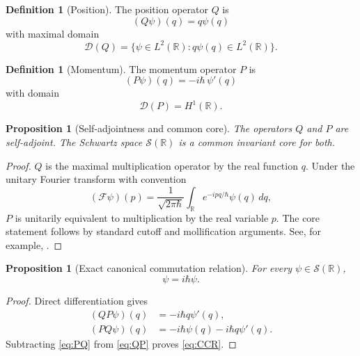 \documentclass[11pt]{amsart}
\numberwithin{equation}{section}
\theoremstyle{plain}
\newtheorem{proposition}[theorem]{Proposition}
\theoremstyle{definition}
\newtheorem{definition}[theorem]{Definition}
\theoremstyle{remark}
\newcommand{\R}{\mathbb{R}}
\newcommand{\Sch}{\mathcal{S}}
\newcommand{\Four}{\mathcal{F}}
\newcommand{\Dom}{\mathcal{D}}
\begin{document}
\begin{definition}[Position]
\label{def:position}
The position operator $Q$ is
\begin{equation}
(Q\psi)(q)=q\psi(q)
\label{eq:Q_action}
\end{equation}
with maximal domain
\begin{equation}
\Dom(Q)=\{\psi\in L^2(\R):q\psi(q)\in L^2(\R)\}.
\label{eq:Q_domain}
\end{equation}
\end{definition}

\begin{definition}[Momentum]
\label{def:momentum}
The momentum operator $P$ is
\begin{equation}
(P\psi)(q)=-i\hbar\,\psi'(q)
\label{eq:P_action}
\end{equation}
with domain
\begin{equation}
\Dom(P)=H^1(\R).
\label{eq:P_domain}
\end{equation}
\end{definition}

\begin{proposition}[Self-adjointness and common core]
\label{prop:self_adjoint_QP}
The operators $Q$ and $P$ are self-adjoint.  The Schwartz space
$\Sch(\R)$ is a common invariant core for both.
\end{proposition}

\begin{proof}
$Q$ is the maximal multiplication operator by the real function $q$.  Under
the unitary Fourier transform with convention
\begin{equation}
(\Four\psi)(p)
=
\frac{1}{\sqrt{2\pi\hbar}}
\int_{\R}e^{-ipq/\hbar}\psi(q)\,dq,
\label{eq:fourier_transform}
\end{equation}
$P$ is unitarily equivalent to multiplication by the real variable $p$.
The core statement follows by standard cutoff and mollification arguments.
See, for example, \cite{ReedSimon1980}.
\end{proof}

\begin{proposition}[Exact canonical commutation relation]
\label{prop:CCR}
For every $\psi\in\Sch(\R)$,
\begin{equation}
[Q,P]\psi=i\hbar\psi.
\label{eq:CCR}
\end{equation}
\end{proposition}

\begin{proof}
Direct differentiation gives
\begin{align}
(QP\psi)(q)
&=-i\hbar q\psi'(q),
\label{eq:QP}\\
(PQ\psi)(q)
&=-i\hbar\psi(q)-i\hbar q\psi'(q).
\label{eq:PQ}
\end{align}
Subtracting \eqref{eq:PQ} from \eqref{eq:QP} proves \eqref{eq:CCR}.
\end{proof}
\end{document}
